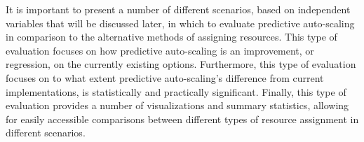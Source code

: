 It is important to present a number of different
scenarios, based on independent variables that will be discussed later, in which
to evaluate predictive auto-scaling in comparison to the alternative methods
of assigning resources. This type of evaluation focuses on how predictive
auto-scaling is an improvement, or regression, on the currently existing
options. Furthermore, this type of evaluation focuses on to what extent
predictive auto-scaling's difference from current implementations,
is statistically and practically significant. Finally, this type of evaluation
provides a number of visualizations and summary statistics, allowing for
easily accessible comparisons between different types of resource assignment
in different scenarios.
